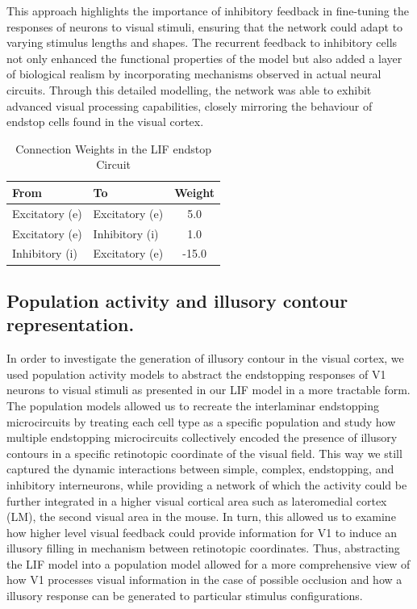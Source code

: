 \documentclass[12pt]{article}
\begin{document}
This approach highlights the importance of inhibitory feedback in fine-tuning the responses of neurons to visual stimuli, ensuring that the network could adapt to varying stimulus lengths and shapes. The recurrent feedback to inhibitory cells not only enhanced the functional properties of the model but also added a layer of biological realism by incorporating mechanisms observed in actual neural circuits. Through this detailed modelling, the network was able to exhibit advanced visual processing capabilities, closely mirroring the behaviour of endstop cells found in the visual cortex.


\begin{table}[h]
  \centering
  \caption{Connection Weights in the LIF endstop Circuit}
  \begin{tabular}{@{}llc@{}}
      \toprule
      \textbf{From} & \textbf{To} & \textbf{Weight} \\ \midrule
      Excitatory (e) & Excitatory (e) & 5.0 \\
      Excitatory (e) & Inhibitory (i) & 1.0 \\
      Inhibitory (i) & Excitatory (e) & -15.0 \\ \bottomrule
  \end{tabular}
\end{table}

\subsection{Population activity and illusory contour representation.}
In order to investigate the generation of illusory contour in the visual cortex, we used population activity models to abstract the endstopping responses of V1 neurons to visual stimuli as presented in our LIF model in a more tractable form. The population models allowed us to recreate the interlaminar endstopping microcircuits by treating each cell type as a specific population and study how multiple endstopping microcircuits collectively encoded the presence of illusory contours in a specific retinotopic coordinate of the visual field. This way we still captured the dynamic interactions between simple, complex, endstopping, and inhibitory interneurons, while providing a network of which the activity could be further integrated in a higher visual cortical area such as lateromedial cortex (LM), the second visual area in the mouse. In turn, this allowed us to examine how higher level visual feedback could provide information for V1 to induce an illusory filling in mechanism between retinotopic coordinates. Thus, abstracting the LIF model into a population model allowed for a more comprehensive view of how V1 processes visual information in the case of possible occlusion and how a illusory response can be generated to particular stimulus configurations.
\end{document}
